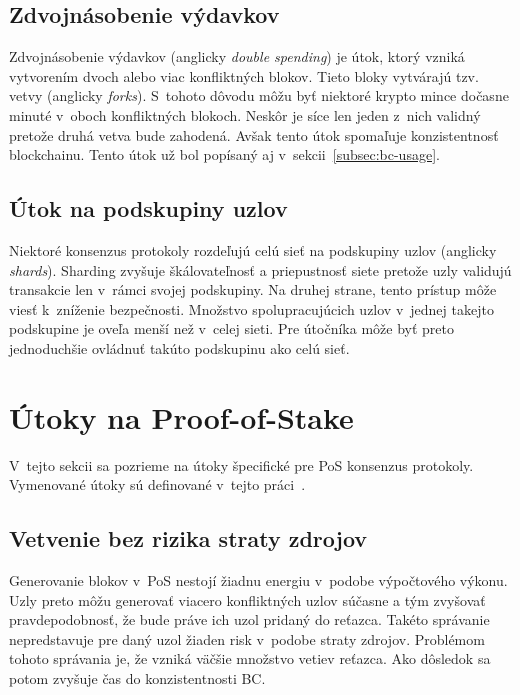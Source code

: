 \subsection{Zdvojnásobenie výdavkov}

Zdvojnásobenie výdavkov (anglicky \textit{double spending}) je útok, ktorý vzniká vytvorením dvoch alebo viac konfliktných blokov. Tieto bloky vytvárajú tzv. vetvy (anglicky \textit{forks}). S~tohoto dôvodu môžu byť niektoré krypto mince dočasne minuté v~oboch konfliktných blokoch. Neskôr je síce len jeden z~nich validný pretože druhá vetva bude zahodená. Avšak tento útok spomaľuje konzistentnosť blockchainu. Tento útok už bol popísaný aj v~sekcii~\ref{subsec:bc-usage}.

\subsection{Útok na podskupiny uzlov}\label{subsec:shard-attack}

Niektoré konsenzus protokoly rozdeľujú celú sieť na podskupiny uzlov (anglicky \textit{shards}). Sharding zvyšuje škálovateľnosť a priepustnosť siete pretože uzly validujú transakcie len v~rámci svojej podskupiny. Na druhej strane, tento prístup môže viesť k~zníženie bezpečnosti. Množstvo spolupracujúcich uzlov v~jednej takejto podskupine je oveľa menší než v~celej sieti. Pre útočníka môže byť preto jednoduchšie ovládnuť takúto podskupinu ako celú sieť.

%

\section{Útoky na Proof-of-Stake}\label{sec:pos-attacks}
V~tejto sekcii sa pozrieme na útoky špecifické pre PoS konsenzus protokoly. Vymenované útoky sú definované v~tejto práci~\cite{homoliakBlockchain}.

\subsection{Vetvenie bez rizika straty zdrojov}
Generovanie blokov v~PoS nestojí žiadnu energiu v~podobe výpočtového výkonu. Uzly preto môžu generovať viacero konfliktných uzlov súčasne a tým zvyšovať pravdepodobnosť, že bude práve ich uzol pridaný do reťazca. Takéto správanie nepredstavuje pre daný uzol žiaden risk v~podobe straty zdrojov. Problémom tohoto správania je, že vzniká väčšie množstvo vetiev reťazca. Ako dôsledok sa potom zvyšuje čas do konzistentnosti BC.

